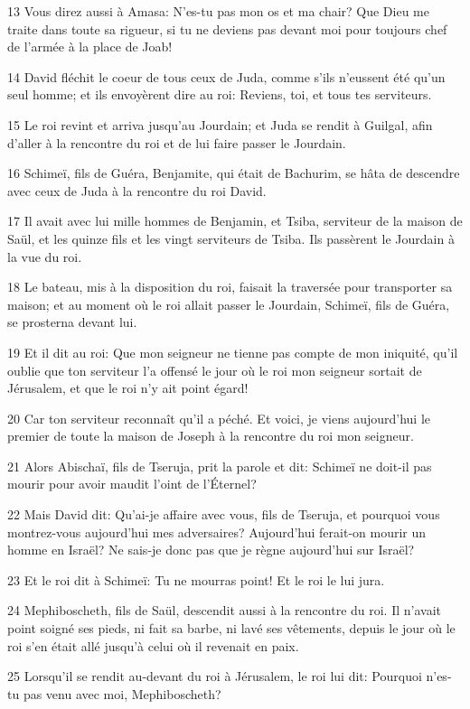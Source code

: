 \par 13 Vous direz aussi à Amasa: N'es-tu pas mon os et ma chair? Que Dieu me traite dans toute sa rigueur, si tu ne deviens pas devant moi pour toujours chef de l'armée à la place de Joab!
\par 14 David fléchit le coeur de tous ceux de Juda, comme s'ils n'eussent été qu'un seul homme; et ils envoyèrent dire au roi: Reviens, toi, et tous tes serviteurs.
\par 15 Le roi revint et arriva jusqu'au Jourdain; et Juda se rendit à Guilgal, afin d'aller à la rencontre du roi et de lui faire passer le Jourdain.
\par 16 Schimeï, fils de Guéra, Benjamite, qui était de Bachurim, se hâta de descendre avec ceux de Juda à la rencontre du roi David.
\par 17 Il avait avec lui mille hommes de Benjamin, et Tsiba, serviteur de la maison de Saül, et les quinze fils et les vingt serviteurs de Tsiba. Ils passèrent le Jourdain à la vue du roi.
\par 18 Le bateau, mis à la disposition du roi, faisait la traversée pour transporter sa maison; et au moment où le roi allait passer le Jourdain, Schimeï, fils de Guéra, se prosterna devant lui.
\par 19 Et il dit au roi: Que mon seigneur ne tienne pas compte de mon iniquité, qu'il oublie que ton serviteur l'a offensé le jour où le roi mon seigneur sortait de Jérusalem, et que le roi n'y ait point égard!
\par 20 Car ton serviteur reconnaît qu'il a péché. Et voici, je viens aujourd'hui le premier de toute la maison de Joseph à la rencontre du roi mon seigneur.
\par 21 Alors Abischaï, fils de Tseruja, prit la parole et dit: Schimeï ne doit-il pas mourir pour avoir maudit l'oint de l'Éternel?
\par 22 Mais David dit: Qu'ai-je affaire avec vous, fils de Tseruja, et pourquoi vous montrez-vous aujourd'hui mes adversaires? Aujourd'hui ferait-on mourir un homme en Israël? Ne sais-je donc pas que je règne aujourd'hui sur Israël?
\par 23 Et le roi dit à Schimeï: Tu ne mourras point! Et le roi le lui jura.
\par 24 Mephiboscheth, fils de Saül, descendit aussi à la rencontre du roi. Il n'avait point soigné ses pieds, ni fait sa barbe, ni lavé ses vêtements, depuis le jour où le roi s'en était allé jusqu'à celui où il revenait en paix.
\par 25 Lorsqu'il se rendit au-devant du roi à Jérusalem, le roi lui dit: Pourquoi n'es-tu pas venu avec moi, Mephiboscheth?
